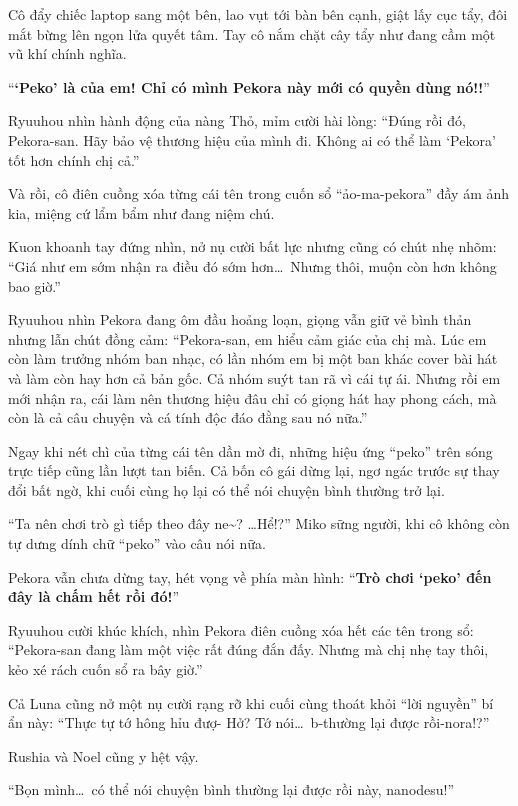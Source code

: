 \documentclass[../main.tex]{subfiles}
\begin{document}
Cô đẩy chiếc laptop sang một bên, lao vụt tới bàn bên cạnh, giật lấy cục tẩy, đôi mắt bừng lên ngọn lửa quyết tâm. Tay cô nắm chặt cây tẩy như đang cầm một vũ khí chính nghĩa.

``\textbf{`Peko' là của em! Chỉ có mình Pekora này mới có quyền dùng nó!!}''

Ryuuhou nhìn hành động của nàng Thỏ, mỉm cười hài lòng: ``Đúng rồi đó, Pekora-san. Hãy bảo vệ thương hiệu của mình đi. Không ai có thể làm `Pekora' tốt hơn chính chị cả.''

Và rồi, cô điên cuồng xóa từng cái tên trong cuốn sổ ``ảo-ma-pekora'' đầy ám ảnh kia, miệng cứ lẩm bẩm như đang niệm chú.


Kuon khoanh tay đứng nhìn, nở nụ cười bất lực nhưng cũng có chút nhẹ nhõm: ``Giá như em sớm nhận ra điều đó sớm hơn\dots\ Nhưng thôi, muộn còn hơn không bao giờ.''

Ryuuhou nhìn Pekora đang ôm đầu hoảng loạn, giọng vẫn giữ vẻ bình thản nhưng lẫn chút đồng cảm: ``Pekora-san, em hiểu cảm giác của chị mà. Lúc em còn làm trưởng nhóm ban nhạc, có lần nhóm em bị một ban khác cover bài hát và làm còn hay hơn cả bản gốc. Cả nhóm suýt tan rã vì cái tự ái. Nhưng rồi em mới nhận ra, cái làm nên thương hiệu đâu chỉ có giọng hát hay phong cách, mà còn là cả câu chuyện và cá tính độc đáo đằng sau nó nữa.''

Ngay khi nét chì của từng cái tên dần mờ đi, những hiệu ứng ``peko'' trên sóng trực tiếp cũng lần lượt tan biến. Cả bốn cô gái dừng lại, ngơ ngác trước sự thay đổi bất ngờ, khi cuối cùng họ lại có thể nói chuyện bình thường trở lại.

``Ta nên chơi trò gì tiếp theo đây ne\~{}? \dots Hể!?'' Miko sững người, khi cô không còn tự dưng dính chữ ``peko'' vào câu nói nữa.

Pekora vẫn chưa dừng tay, hét vọng về phía màn hình: ``\textbf{Trò chơi `peko' đến đây là chấm hết rồi đó!}''

Ryuuhou cười khúc khích, nhìn Pekora điên cuồng xóa hết các tên trong sổ: ``Pekora-san đang làm một việc rất đúng đắn đấy. Nhưng mà chị nhẹ tay thôi, kẻo xé rách cuốn sổ ra bây giờ.''

Cả Luna cũng nở một nụ cười rạng rỡ khi cuối cùng thoát khỏi ``lời nguyền'' bí ẩn này: ``Thực tự tớ hông hỉu đượ- Hở? Tớ nói\dots\ b-thường lại được rồi-nora!?''

Rushia và Noel cũng y hệt vậy.

``Bọn mình\dots\ có thể nói chuyện bình thường lại được rồi này, nanodesu!''
\end{document}
